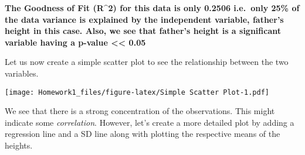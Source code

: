 \documentclass[
]{article}
\newenvironment{Shaded}{\begin{snugshade}}{\end{snugshade}}
\newcommand{\AttributeTok}[1]{\textcolor[rgb]{0.77,0.63,0.00}{#1}}
\newcommand{\CommentTok}[1]{\textcolor[rgb]{0.56,0.35,0.01}{\textit{#1}}}
\newcommand{\DecValTok}[1]{\textcolor[rgb]{0.00,0.00,0.81}{#1}}
\newcommand{\FunctionTok}[1]{\textcolor[rgb]{0.00,0.00,0.00}{#1}}
\newcommand{\NormalTok}[1]{#1}
\newcommand{\SpecialCharTok}[1]{\textcolor[rgb]{0.00,0.00,0.00}{#1}}
\newcommand{\StringTok}[1]{\textcolor[rgb]{0.31,0.60,0.02}{#1}}
\begin{document}
\textbf{The Goodness of Fit (R\^{}2) for this data is only 0.2506
i.e.~only 25\% of the data variance is explained by the independent
variable, father's height in this case. Also, we see that father's
height is a significant variable having a p-value \textless\textless{}
0.05}

Let us now create a simple scatter plot to see the relationship between
the two variables.

\begin{Shaded}
\end{Shaded}

\texttt{[image: Homework1\_files/figure-latex/Simple Scatter Plot-1.pdf]}

We see that there is a strong concentration of the observations. This
might indicate some \emph{correlation}. However, let's create a more
detailed plot by adding a regression line and a SD line along with
plotting the respective means of the heights.
\end{document}
